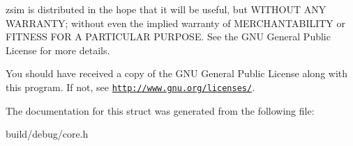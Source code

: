 zsim is distributed in the hope that it will be useful, but W\-I\-T\-H\-O\-U\-T A\-N\-Y W\-A\-R\-R\-A\-N\-T\-Y; without even the implied warranty of M\-E\-R\-C\-H\-A\-N\-T\-A\-B\-I\-L\-I\-T\-Y or F\-I\-T\-N\-E\-S\-S F\-O\-R A P\-A\-R\-T\-I\-C\-U\-L\-A\-R P\-U\-R\-P\-O\-S\-E. See the G\-N\-U General Public License for more details.

You should have received a copy of the G\-N\-U General Public License along with this program. If not, see \href{http://www.gnu.org/licenses/}{\tt http\-://www.\-gnu.\-org/licenses/}. 

The documentation for this struct was generated from the following file\-:\begin{DoxyCompactItemize}
\item 
build/debug/core.\-h\end{DoxyCompactItemize}
